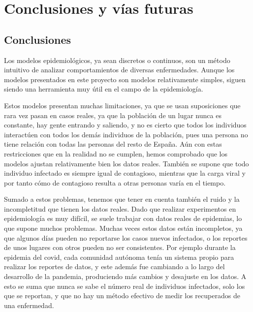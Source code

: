 
\chapter{Conclusiones y vías futuras}

\section{Conclusiones}

Los modelos epidemiológicos, ya sean discretos o continuos, son un método intuitivo de analizar comportamientos de diversas enfermedades. Aunque los modelos presentados en este proyecto son modelos relativamente simples, siguen siendo una herramienta muy útil en el campo de la epidemiología.

Estos modelos presentan muchas limitaciones, ya que se usan suposiciones que rara vez pasan en casos reales, ya que la población de un lugar nunca es constante, hay gente entrando y saliendo, y no es cierto que todos los individuos interactúen con todos los demás individuos de la población, pues una persona no tiene relación con todas las personas del resto de España. Aún con estas restricciones que en la realidad no se cumplen, hemos comprobado que los modelos ajustan relativamente bien los datos reales. También se supone que todo individuo infectado es siempre igual de contagioso, mientras que la carga viral y por tanto cómo de contagioso resulta a otras personas varía en el tiempo.

Sumado a estos problemas, tenemos que tener en cuenta también el ruido y la incompletitud que tienen los datos reales. Dado que realizar experimentos en epidemiología es muy difícil, se suele trabajar con datos reales de epidemias, lo que supone muchos problemas. Muchas veces estos datos están incompletos, ya que algunos días pueden no reportarse los casos nuevos infectados, o los reportes de unos lugares con otros pueden no ser consistentes. Por ejemplo durante la epidemia del covid, cada comunidad autónoma tenía un sistema propio para realizar los reportes de datos, y este además fue cambiando a lo largo del desarrollo de la pandemia, produciendo más cambios y desajuste en los datos. A esto se suma que nunca se sabe el número real de individuos infectados, solo los que se reportan, y que no hay un método efectivo de medir los recuperados de una enfermedad.

